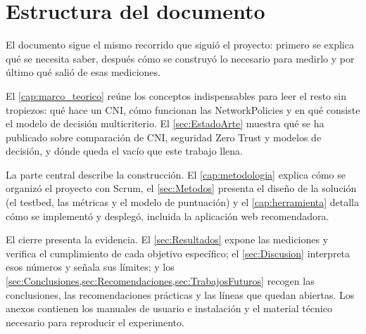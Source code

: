 \section{Estructura del documento}

El documento sigue el mismo recorrido que siguió el proyecto: primero se explica qué se necesita saber, después cómo se construyó lo necesario para medirlo y por último qué salió de esas mediciones.

El \cref{cap:marco_teorico} reúne los conceptos indispensables para leer el resto sin tropiezos: qué hace un CNI, cómo funcionan las NetworkPolicies y en qué consiste el modelo de decisión multicriterio. El \cref{sec:EstadoArte} muestra qué se ha publicado sobre comparación de CNI, seguridad Zero Trust y modelos de decisión, y dónde queda el vacío que este trabajo llena.

La parte central describe la construcción. El \cref{cap:metodologia} explica cómo se organizó el proyecto con Scrum, el \cref{sec:Metodos} presenta el diseño de la solución (el testbed, las métricas y el modelo de puntuación) y el \cref{cap:herramienta} detalla cómo se implementó y desplegó, incluida la aplicación web recomendadora.

El cierre presenta la evidencia. El \cref{sec:Resultados} expone las mediciones y verifica el cumplimiento de cada objetivo específico; el \cref{sec:Discusion} interpreta esos números y señala sus límites; y los \cref{sec:Conclusiones,sec:Recomendaciones,sec:TrabajosFuturos} recogen las conclusiones, las recomendaciones prácticas y las líneas que quedan abiertas. Los anexos contienen los manuales de usuario e instalación y el material técnico necesario para reproducir el experimento.
